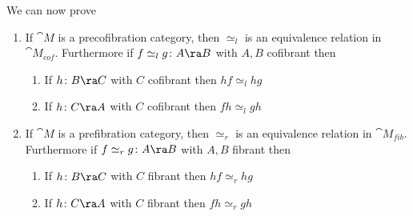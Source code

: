 We can now prove
\begin{thm}
\label{thm::homotopyequivrel}
\mbox{}
\begin{enumerate}
\item
If ${\cat M}$ is a precofibration category, then $\simeq_l$ is an equivalence relation in ${\cat M}_{cof}$. Furthermore if $f \simeq_l g \colon A \ra B$ with $A, B$ cofibrant then
\begin{enumerate}
\item
If $h \colon B \ra C$ with $C$ cofibrant then $hf \simeq_l hg$
\item
If $h \colon C \ra A$ with $C$ cofibrant then $fh \simeq_l gh$
\end{enumerate}
\item
If ${\cat M}$ is a prefibration category, then $\simeq_r$ is an equivalence relation in ${\cat M}_{fib}$. Furthermore if $f \simeq_r g \colon A \ra B$ with $A, B$ fibrant then
\begin{enumerate}
\item
If $h \colon B \ra C$ with $C$ fibrant then $hf \simeq_r hg$
\item
If $h \colon C \ra A$ with $C$ fibrant then $fh \simeq_r gh$
\end{enumerate}
\end{enumerate}
\end{thm}

